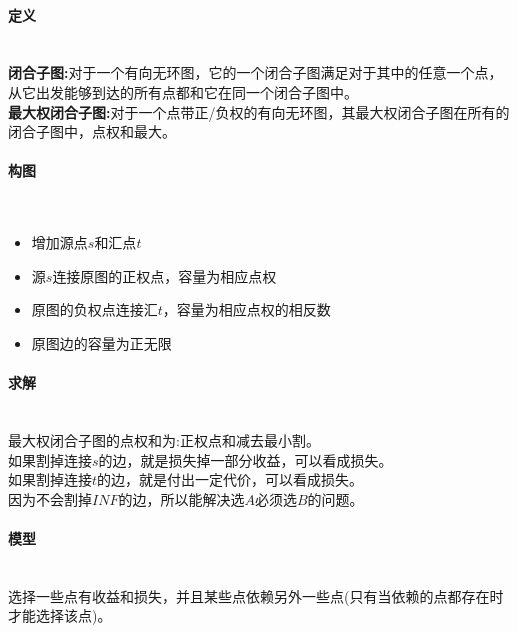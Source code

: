 \paragraph{定义}~{}
\\
\textbf{闭合子图:}对于一个有向无环图，它的一个闭合子图满足对于其中的任意一个点，从它出发能够到达的所有点都和它在同一个闭合子图中。\\
\textbf{最大权闭合子图:}对于一个点带正/负权的有向无环图，其最大权闭合子图在所有的闭合子图中，点权和最大。

\paragraph{构图}~{}
\\
\begin{itemize}
\item 增加源点$s$和汇点$t$
\item 源$s$连接原图的正权点，容量为相应点权
\item 原图的负权点连接汇$t$，容量为相应点权的相反数
\item 原图边的容量为正无限
\end{itemize}

\paragraph{求解}~{}
\\
最大权闭合子图的点权和为:正权点和减去最小割。\\
如果割掉连接$s$的边，就是损失掉一部分收益，可以看成损失。\\
如果割掉连接$t$的边，就是付出一定代价，可以看成损失。\\
因为不会割掉$INF$的边，所以能解决选$A$必须选$B$的问题。

\paragraph{模型}~{}
\\
选择一些点有收益和损失，并且某些点依赖另外一些点(只有当依赖的点都存在时才能选择该点)。\\